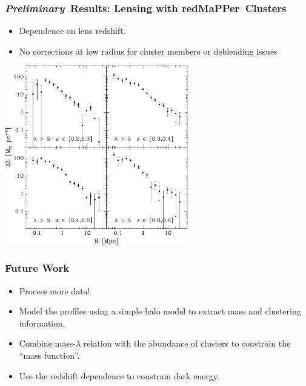 \documentclass{beamer}
\newcommand{\redmapper}{redMaPPer}
\newcommand{\prelim}{{\bf{\it Preliminary}}}
\begin{document}
\frame
{
    \frametitle{\prelim\ Results: Lensing with \redmapper\ Clusters}

    \begin{itemize}

        \item Dependence on lens redshift.

        \item No corrections at low radius for cluster members or deblending issues

    \end{itemize}


    \begin{center}
        \includegraphics[width=0.6\textwidth]{run-rm008-bin-lgt05-zbin4-jack.pdf}
    \end{center}

}

\frame
{
    \frametitle{Future Work}

    \begin{itemize}

        \item Process more data!

        \item Model the profiles using a simple halo model to extract
            mass and clustering information.

        \item Combine mass-$\lambda$ relation with the abundance of clusters to
            constrain the ``mass function''.

        \item Use the redshift dependence to constrain dark energy.

    \end{itemize}

}
\end{document}
